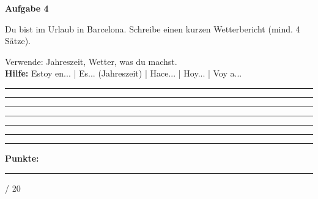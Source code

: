 \documentclass[11pt, a4paper]{article}
\newcommand{\fachfarbe}{spanisch}
\newcommand{\maxpunkte}{20}
\newcommand{\punktebox}[1]{\hfill\fbox{\small \_/#1}}
\newcommand{\luecke}[1]{\rule{#1}{0.4pt}}
\newenvironment{aufgabe}[1]{%
    \needspace{5\baselineskip}%
    \nopagebreak[4]%
    \vspace{10pt}
    \noindent\textbf{\textcolor{\fachfarbe}{Aufgabe #1}}
    \nopagebreak[4]%
    \vspace{5pt}
    \nopagebreak[4]%
    \begin{list}{}{\leftmargin=0pt}
    \item[]
}{%
    \end{list}
}
\begin{document}
\begin{aufgabe}{4}
Du bist im Urlaub in Barcelona. Schreibe einen kurzen Wetterbericht (mind. 4 Sätze). \punktebox{8}
\end{aufgabe}

\begin{hinweis}
Verwende: Jahreszeit, Wetter, was du machst. \\
\textbf{Hilfe:} Estoy en... | Es... (Jahreszeit) | Hace... | Hoy... | Voy a...
\end{hinweis}

\vspace{0.5em}

\noindent\luecke{\textwidth}

\vspace{0.8em}

\noindent\luecke{\textwidth}

\vspace{0.8em}

\noindent\luecke{\textwidth}

\vspace{0.8em}

\noindent\luecke{\textwidth}

\vspace{0.8em}

\noindent\luecke{\textwidth}

\vspace{0.8em}

\noindent\luecke{\textwidth}


\vspace{20pt}
\hrule
\vspace{10pt}

\begin{flushright}
\textbf{Punkte:} \luecke{1cm} / \maxpunkte
\end{flushright}
\end{document}
